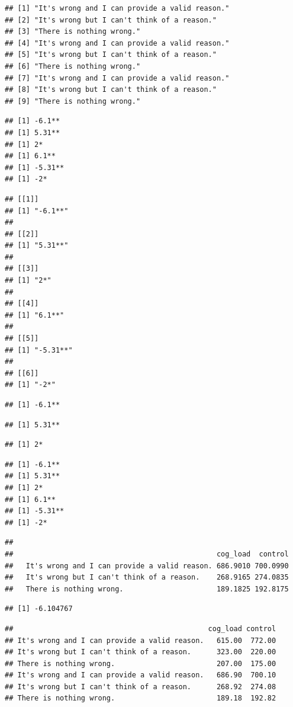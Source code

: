 \documentclass[
  american,
  man,floatsintext]{apa7}
\begin{document}
\newpage

\begin{verbatim}
## [1] "It's wrong and I can provide a valid reason."
## [2] "It's wrong but I can't think of a reason."   
## [3] "There is nothing wrong."                     
## [4] "It's wrong and I can provide a valid reason."
## [5] "It's wrong but I can't think of a reason."   
## [6] "There is nothing wrong."                     
## [7] "It's wrong and I can provide a valid reason."
## [8] "It's wrong but I can't think of a reason."   
## [9] "There is nothing wrong."
\end{verbatim}

\begin{verbatim}
## [1] -6.1**
## [1] 5.31**
## [1] 2*
## [1] 6.1**
## [1] -5.31**
## [1] -2*
\end{verbatim}

\begin{verbatim}
## [[1]]
## [1] "-6.1**"
## 
## [[2]]
## [1] "5.31**"
## 
## [[3]]
## [1] "2*"
## 
## [[4]]
## [1] "6.1**"
## 
## [[5]]
## [1] "-5.31**"
## 
## [[6]]
## [1] "-2*"
\end{verbatim}

\begin{verbatim}
## [1] -6.1**
\end{verbatim}

\begin{verbatim}
## [1] 5.31**
\end{verbatim}

\begin{verbatim}
## [1] 2*
\end{verbatim}

\begin{verbatim}
## [1] -6.1**
## [1] 5.31**
## [1] 2*
## [1] 6.1**
## [1] -5.31**
## [1] -2*
\end{verbatim}

\begin{verbatim}
##                                               
##                                                cog_load  control
##   It's wrong and I can provide a valid reason. 686.9010 700.0990
##   It's wrong but I can't think of a reason.    268.9165 274.0835
##   There is nothing wrong.                      189.1825 192.8175
\end{verbatim}

\begin{verbatim}
## [1] -6.104767
\end{verbatim}

\begin{verbatim}
##                                              cog_load control
## It's wrong and I can provide a valid reason.   615.00  772.00
## It's wrong but I can't think of a reason.      323.00  220.00
## There is nothing wrong.                        207.00  175.00
## It's wrong and I can provide a valid reason.   686.90  700.10
## It's wrong but I can't think of a reason.      268.92  274.08
## There is nothing wrong.                        189.18  192.82
\end{verbatim}
\end{document}
